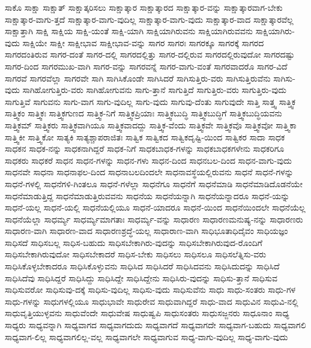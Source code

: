 {ಸಾಕೊ
ಸಾಕ್ಷಾ
ಸಾಕ್ಷಾತ್
ಸಾಕ್ಷಾತ್ಕರಿಸಲು
ಸಾಕ್ಷಾತ್ಕಾರ
ಸಾಕ್ಷಾತ್ಕಾರದ
ಸಾಕ್ಷಾತ್ಕಾರ-ವನ್ನು
ಸಾಕ್ಷಾತ್ಕಾರವಾಗ-ಬೇಕು
ಸಾಕ್ಷಾತ್ಕಾರ-ವಾಗು-ತ್ತದೆ
ಸಾಕ್ಷಾತ್ಕಾರ-ವಾಗು-ವುದಿಲ್ಲ
ಸಾಕ್ಷಾತ್ಕಾರ-ವಾಗು-ವುದು
ಸಾಕ್ಷಾತ್ಕಾರ-ವಾದ
ಸಾಕ್ಷಾತ್ಕಾರವೆಲ್ಲ
ಸಾಕ್ಷಾತ್ತಾಗಿ
ಸಾಕ್ಷಿ
ಸಾಕ್ಷಿಯ
ಸಾಕ್ಷಿ-ಯಂತೆ
ಸಾಕ್ಷಿ-ಯಾಗಿ
ಸಾಕ್ಷಿಯಾಗಿರುವನು
ಸಾಕ್ಷಿಯಾಗಿರುವವನು
ಸಾಕ್ಷಿಯಾಗಿರು-ವುದು
ಸಾಕ್ಷಿಯೇ
ಸಾಕ್ಷೀ
ಸಾಕ್ಷೀಭಾವ
ಸಾಕ್ಷೀಭಾವ-ವನ್ನು
ಸಾಗರ
ಸಾಗರಃ
ಸಾಗರಕ್ಕೂ
ಸಾಗರಕ್ಕೆ
ಸಾಗರದ
ಸಾಗರದಂತಿರುವ
ಸಾಗರ-ದಂತೆ
ಸಾಗರ-ದಲ್ಲಿ
ಸಾಗರದಲ್ಲಿತ್ತು
ಸಾಗರ-ದಲ್ಲಿರುವ
ಸಾಗರದಲ್ಲಿರುವುದೋ
ಸಾಗರದಷ್ಟು
ಸಾಗರ-ದಿಂದ
ಸಾಗರಮುಖ-ವಾಗಿ
ಸಾಗರ-ವನ್ನು
ಸಾಗರವನ್ನೆ
ಸಾಗರ-ವಾಗು-ವಂತೆ
ಸಾಗರವಾದರೊ
ಸಾಗರ-ವಿದೆ
ಸಾಗರವೆ
ಸಾಗರವೆಲ್ಲಾ
ಸಾಗರವೇ
ಸಾಗಿ
ಸಾಗಿಸಿಕೊಂಡೇ
ಸಾಗಿಸಿದರೆ
ಸಾಗಿಸುತ್ತಿರು-ವರು
ಸಾಗಿಸುತ್ತಿರುವೆನು
ಸಾಗಿಸು-ವುದು
ಸಾಗಿಹೋಗುತ್ತಿರು-ವರು
ಸಾಗಿಹೋಗುವನು
ಸಾಗು-ತ್ತಾನೆ
ಸಾಗುತ್ತಿದೆ
ಸಾಗುತ್ತಿರು-ವರು
ಸಾಗುತ್ತಿರು-ವುದು
ಸಾಗುತ್ತಿವೆ
ಸಾಗುವನು
ಸಾಗು-ವಾಗ
ಸಾಗು-ವುದಿಲ್ಲ
ಸಾಗು-ವುದು
ಸಾಗುವು-ದೆಂತು
ಸಾಗುವುದೇ
ಸಾತ್ತಿ
ಸಾತ್ತ್ವ
ಸಾತ್ತ್ವಿಕ
ಸಾತ್ತ್ವಿಕಂ
ಸಾತ್ತ್ವಿಕಃ
ಸಾತ್ತ್ವಿಕಗುಣದ
ಸಾತ್ತ್ವಿಕ-ನಿಗೆ
ಸಾತ್ತ್ವಿಕಪ್ರಿಯಾಃ
ಸಾತ್ತ್ವಿಕಬುದ್ಧಿ
ಸಾತ್ತ್ವಿಕಬುದ್ಧಿಗೆ
ಸಾತ್ತ್ವಿಕಬುದ್ಧಿಯವನು
ಸಾತ್ತ್ವಿಕಮ್
ಸಾತ್ತ್ವಿಕರು
ಸಾತ್ತ್ವಿಕವಾಗಿಯೂ
ಸಾತ್ತ್ವಿಕವಾದದ್ದು
ಸಾತ್ತ್ವಿಕ-ವೆಂದು
ಸಾತ್ತ್ವಿಕವೇ
ಸಾತ್ತ್ವಿಕವೊ
ಸಾತ್ತ್ವಿಕವೋ
ಸಾತ್ತ್ವಿಕಾ
ಸಾತ್ತ್ವಿಕೀ
ಸಾತ್ತ್ವಿಕೋ
ಸಾತ್ಯಕಿ
ಸಾತ್ಯಶ್ಚಾಪರಾಜಿತಃ
ಸಾತ್ವಿಕ
ಸಾತ್ವಿಕದ
ಸಾತ್ವಿಕದೃಷ್ಟಿ-ಯಿಂದ
ಸಾತ್ವಿಕರ
ಸಾದಾ
ಸಾಧಕ
ಸಾಧಕನ
ಸಾಧಕ-ನನ್ನು
ಸಾಧಕನಾಗಿದ್ದರೆ
ಸಾಧಕ-ನಿಗೆ
ಸಾಧಕಬಾಧಕ-ಗಳನ್ನು
ಸಾಧಕಬಾಧಕಗಳೇನು
ಸಾಧಕರಿಗೂ
ಸಾಧಕರು
ಸಾಧಕರೆ
ಸಾಧನ
ಸಾಧನ-ಗಳನ್ನು
ಸಾಧನ-ಗಳು
ಸಾಧನ-ದಿಂದ
ಸಾಧನಬಲ-ದಿಂದ
ಸಾಧನ-ವಾಗು-ವುದು
ಸಾಧನವೇ
ಸಾಧನಾ
ಸಾಧನಾಫಲ-ದಿಂದ
ಸಾಧನಾಬಲದಿಂದಲೇ
ಸಾಧನಾವಸ್ಥೆಯಲ್ಲಿರುವನು
ಸಾಧನೆ
ಸಾಧನೆ-ಗಳನ್ನು
ಸಾಧನೆ-ಗಳಲ್ಲಿ
ಸಾಧನೆಗಳಿ-ಗಿಂತಲೂ
ಸಾಧನೆ-ಗಳೆಲ್ಲಾ
ಸಾಧನೆಗೂ
ಸಾಧನೆಗೆ
ಸಾಧನೆಮಾಡಿ
ಸಾಧನೆಮಾಡಿದೊಡನೆಯೇ
ಸಾಧನೆಮಾಡುತ್ತಿದ್ದ
ಸಾಧನೆಮಾಡುತ್ತಿರುವವನು
ಸಾಧನೆಯ
ಸಾಧನೆಯನ್ನಾಗಿ
ಸಾಧನೆಯನ್ನಾದರೂ
ಸಾಧನೆ-ಯನ್ನು
ಸಾಧನೆ-ಯಲ್ಲ
ಸಾಧನೆ-ಯಲ್ಲಿ
ಸಾಧನೆಯಲ್ಲಿಯೂ
ಸಾಧನೆ-ಯಾದರೂ
ಸಾಧನೆ-ಯಿಂದ
ಸಾಧನೆಯಿಂದಲೇ
ಸಾಧನೆಯೆಲ್ಲ
ಸಾಧನೆಯೆಲ್ಲಾ
ಸಾಧರ್ಮ್ಯ
ಸಾಧರ್ಮ್ಯಮಾಗತಾಃ
ಸಾಧರ್ಮ್ಯ-ವನ್ನು
ಸಾಧಾರಣ
ಸಾಧಾರಣಮನುಷ್ಯ-ನನ್ನು
ಸಾಧಾರಣರು
ಸಾಧಾರಣ-ವಾಗಿ
ಸಾಧಾರಣ-ವಾದ
ಸಾಧಾರಣಶ್ರದ್ಧೆ-ಯಲ್ಲ
ಸಾಧಾರಾಣ-ವಾಗಿ
ಸಾಧಿಭೂತಾಧಿದೈವಂ
ಸಾಧಿಯಜ್ಞಂ
ಸಾಧಿಸದೆ
ಸಾಧಿಸಬಲ್ಲ
ಸಾಧಿಸ-ಬಹುದು
ಸಾಧಿಸಬೇಕಾಗಿರು-ವುದನ್ನು
ಸಾಧಿಸಬೇಕಾಗಿರುವುದ-ರೊಂದಿಗೆ
ಸಾಧಿಸಬೇಕಾಗಿರುವುದೋ
ಸಾಧಿಸಬೇಕಾದರೆ
ಸಾಧಿಸ-ಬೇಕು
ಸಾಧಿಸಲು
ಸಾಧಿಸಲೂ
ಸಾಧಿಸಲೆತ್ನಿಸು-ವರು
ಸಾಧಿಸಿಕೊಳ್ಳಬೇಕಾದರೂ
ಸಾಧಿಸಿಕೊಳ್ಳುವನು
ಸಾಧಿಸಿದ
ಸಾಧಿಸಿದರೆ
ಸಾಧಿಸಿದವನು
ಸಾಧಿಸಿದುದನ್ನು
ಸಾಧಿಸಿದೆ
ಸಾಧಿಸಿದೆವು
ಸಾಧಿಸಿದ್ದರೆ
ಸಾಧಿಸಿದ್ದು
ಸಾಧಿಸಿದ್ದೇ
ಸಾಧಿಸಿದ್ದೇನು
ಸಾಧಿಸಿರು-ವುದನ್ನು
ಸಾಧಿಸು-ತ್ತಾನೆ
ಸಾಧಿಸುವ
ಸಾಧಿಸುವರೋ
ಸಾಧಿಸುವು-ದಕ್ಕೆ
ಸಾಧಿಸು-ವುದಿಲ್ಲ
ಸಾಧಿಸು-ವುದು
ಸಾಧಿಸುವೆನು
ಸಾಧು
ಸಾಧು-ಸಂತರು
ಸಾಧು-ಗಳ
ಸಾಧು-ಗಳನ್ನು
ಸಾಧುಗಳಲ್ಲಿಯೂ
ಸಾಧುಭಾವೇ
ಸಾಧುರೇವ
ಸಾಧುವಾಗಿದ್ದರೆ
ಸಾಧು-ವಾದ
ಸಾಧುವಿನ
ಸಾಧುವಿ-ನಲ್ಲಿ
ಸಾಧುವೃತ್ತಿಯುಳ್ಳವನು
ಸಾಧುವೆಂದೇ
ಸಾಧುವೇಷ
ಸಾಧುಷ್ವಪಿ
ಸಾಧುಸಂತರು
ಸಾಧುಸಜ್ಜನರು
ಸಾಧೂನಾಂ
ಸಾಧ್ಯ
ಸಾಧ್ಯರು
ಸಾಧ್ಯವನ್ನಾಗಿ
ಸಾಧ್ಯವಾಗದ
ಸಾಧ್ಯವಾಗದುದು
ಸಾಧ್ಯವಾಗದೆ
ಸಾಧ್ಯವಾಗದೇ
ಸಾಧ್ಯವಾಗ-ಬಹುದು
ಸಾಧ್ಯವಾಗಲಿ
ಸಾಧ್ಯವಾಗ-ಲಿಲ್ಲ
ಸಾಧ್ಯವಾಗಲಿಲ್ಲ-ವಲ್ಲ
ಸಾಧ್ಯವಾಗಲೇ
ಸಾಧ್ಯವಾಗುವ
ಸಾಧ್ಯ-ವಾಗು-ವುದಿಲ್ಲ
ಸಾಧ್ಯ-ವಾಗು-ವುದು
}
